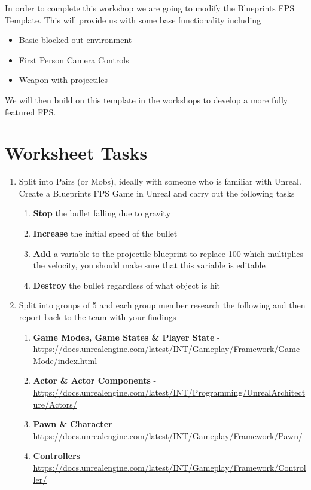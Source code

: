 \documentclass{../../../fal_assignment}
\begin{document}
In order to complete this workshop we are going to modify the Blueprints FPS Template. This will provide us with some base functionality including

\begin{itemize}
	\item Basic blocked out environment
	\item First Person Camera Controls
	\item Weapon with projectiles
\end{itemize}

We will then build on this template in the workshops to develop a more fully featured FPS.

\section*{Worksheet Tasks}

\begin{enumerate}
	\item Split into Pairs (or Mobs), ideally with someone who is familiar with Unreal. Create a Blueprints FPS Game in Unreal and carry out the following tasks
		\begin{enumerate}[label=(\Alph*)]
		\item \textbf{Stop} the bullet falling due to gravity
		\item \textbf{Increase} the initial speed of the bullet
		\item \textbf{Add} a variable to the projectile blueprint to replace 100 which multiplies the velocity, you should make sure that this variable is editable
		\item \textbf{Destroy} the bullet regardless of what object is hit
		\end{enumerate}
	\item Split into groups of 5 and each group member research the following and then report back to the team with your findings
	\begin{enumerate}[label=(\Alph*)]
		\item \textbf{Game Modes, Game States \& Player State} - \url{https://docs.unrealengine.com/latest/INT/Gameplay/Framework/GameMode/index.html}
		\item \textbf{Actor \& Actor Components} - \url{https://docs.unrealengine.com/latest/INT/Programming/UnrealArchitecture/Actors/}
		\item \textbf{Pawn \& Character} - \url{https://docs.unrealengine.com/latest/INT/Gameplay/Framework/Pawn/}
		\item \textbf{Controllers} - \url{https://docs.unrealengine.com/latest/INT/Gameplay/Framework/Controller/}
	\end{enumerate}		
\end{enumerate}
\end{document}
